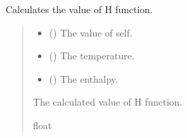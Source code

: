 \documentclass[a4paper,11pt,english,openany]{sphinxmanual}
\begin{document}
\begin{fulllineitems}
\label{\detokenize{api/spyice.update_physical_values:spyice.update_physical_values.H_function}}
\pysigstartsignatures
{}
\pysigstopsignatures
\sphinxAtStartPar
Calculates the value of H function.
\begin{quote}\begin{description}
\begin{itemize}
\item {} 
\sphinxAtStartPar
{} () \textendash{} The value of self.

\item {} 
\sphinxAtStartPar
{} () \textendash{} The temperature.

\item {} 
\sphinxAtStartPar
{} () \textendash{} The enthalpy.

\end{itemize}

\sphinxAtStartPar
The calculated value of H function.

\sphinxAtStartPar
float

\end{description}\end{quote}

\end{fulllineitems}

\end{document}
